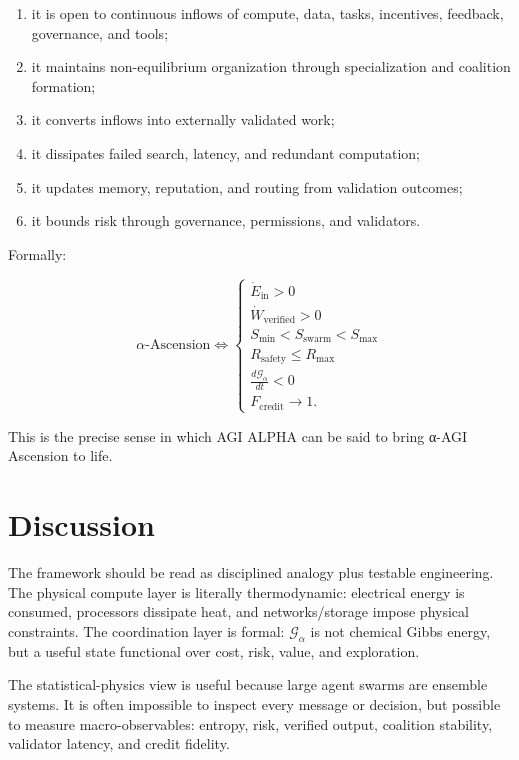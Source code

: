\documentclass[11pt]{article}
\providecommand{\tightlist}{\setlength{\itemsep}{0pt}\setlength{\parskip}{0pt}}
\begin{document}
\begin{enumerate}
\def\labelenumi{\arabic{enumi}.}
\tightlist
\item
  it is open to continuous inflows of compute, data, tasks, incentives, feedback, governance, and tools;
\item
  it maintains non-equilibrium organization through specialization and coalition formation;
\item
  it converts inflows into externally validated work;
\item
  it dissipates failed search, latency, and redundant computation;
\item
  it updates memory, reputation, and routing from validation outcomes;
\item
  it bounds risk through governance, permissions, and validators.
\end{enumerate}

Formally:

\[
\alpha\text{-Ascension}
\iff
\begin{cases}
\dot{E}_{\text{in}}>0 \\
\dot{W}_{\text{verified}}>0 \\
S_{\min}<S_{\text{swarm}}<S_{\max} \\
R_{\text{safety}}\leq R_{\max} \\
\frac{d\mathcal{G}_{\alpha}}{dt}<0 \\
F_{\text{credit}}\rightarrow 1.
\end{cases}
\]

This is the precise sense in which AGI ALPHA can be said to bring α-AGI Ascension to life.

\section{Discussion}\label{discussion}

The framework should be read as disciplined analogy plus testable engineering. The physical compute layer is literally thermodynamic: electrical energy is consumed, processors dissipate heat, and networks/storage impose physical constraints. The coordination layer is formal: \(\mathcal{G}_{\alpha}\) is not chemical Gibbs energy, but a useful state functional over cost, risk, value, and exploration.

The statistical-physics view is useful because large agent swarms are ensemble systems. It is often impossible to inspect every message or decision, but possible to measure macro-observables: entropy, risk, verified output, coalition stability, validator latency, and credit fidelity.
\end{document}
